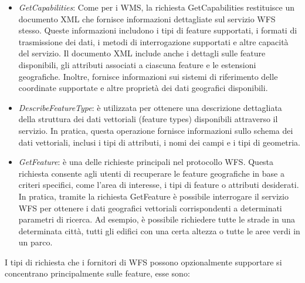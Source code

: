 \begin{itemize}
      \item \textit{GetCapabilities}: Come per i WMS, la richiesta GetCapabilities restituisce un documento XML che fornisce informazioni dettagliate sul servizio WFS stesso. Queste informazioni includono i tipi di feature supportati, i formati di trasmissione dei dati, i metodi di interrogazione supportati e altre capacità del servizio. Il documento XML include anche i dettagli sulle feature disponibili, gli attributi associati a ciascuna feature e le estensioni geografiche. Inoltre, fornisce informazioni sui sistemi di riferimento delle coordinate supportate e altre proprietà dei dati geografici disponibili.
      \item \textit{DescribeFeatureType}: è utilizzata per ottenere una descrizione dettagliata della struttura dei dati vettoriali (feature types) disponibili attraverso il servizio. In pratica, questa operazione fornisce informazioni sullo schema dei dati vettoriali, inclusi i tipi di attributi, i nomi dei campi e i tipi di geometria.
      \item \textit{GetFeature}: è una delle richieste principali nel protocollo WFS. Questa richiesta consente agli utenti di recuperare le feature geografiche in base a criteri specifici, come l'area di interesse, i tipi di feature o attributi desiderati. In pratica, tramite la richiesta GetFeature è possibile interrogare il servizio WFS per ottenere i dati geografici vettoriali corrispondenti a determinati parametri di ricerca. Ad esempio, è possibile richiedere tutte le strade in una determinata città, tutti gli edifici con una certa altezza o tutte le aree verdi in un parco.
\end{itemize}
I tipi di richiesta che i fornitori di WFS possono opzionalmente supportare si concentrano principalmente sulle feature, esse sono:
